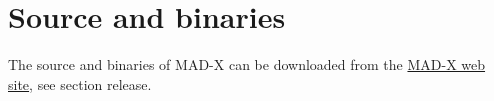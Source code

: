
\section{Source and binaries}

 The source and binaries of MAD-X can be downloaded from the
 \href{http://cern.ch/madx}{MAD-X web site}, see section release.   

% 
% 
% 
% 
% 
% 

